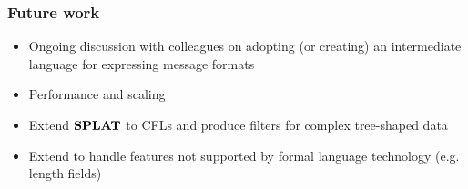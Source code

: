 \documentclass{beamer}
\newcommand{\konst}[1]{\ensuremath{\mbox{\bf{#1}}}}
\begin{document}
\begin{frame}\frametitle{Future work}

\begin{itemize}

\item Ongoing discussion with colleagues on adopting (or creating)
  an intermediate language for expressing message formats

\vspace*{2mm}

\item Performance and scaling

\vspace*{2mm}

\item Extend \konst{SPLAT} to CFLs and produce filters for complex tree-shaped data

\vspace*{2mm}

\item Extend to handle features not supported by formal language
  technology (e.g. length fields)

\end{itemize}

\end{frame}
\end{document}
